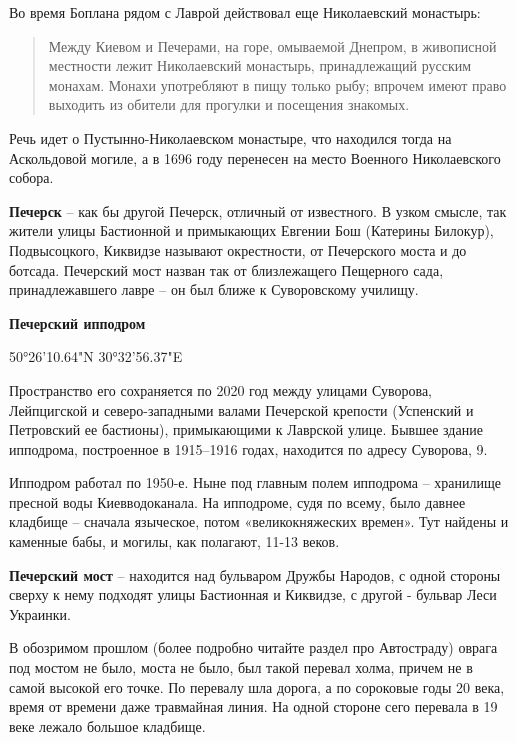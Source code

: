 Во время Боплана рядом с Лаврой действовал еще Николаевский монастырь:

\begin{quotation}
Между Киевом и Печерами, на горе, омываемой Днепром, в живописной местности лежит Николаевский монастырь, принадлежащий русским монахам. Монахи употребляют в пищу только рыбу; впрочем имеют право выходить из обители для прогулки и посещения знакомых.
\end{quotation}

Речь идет о Пустынно-Николаевском монастыре, что находился тогда на Аскольдовой могиле, а в 1696 году перенесен на место Военного Николаевского собора.\\

\medskip

\textbf{Печерск} – как бы другой Печерск, отличный от известного. В узком смысле, так жители улицы Бастионной и примыкающих Евгении Бош (Катерины Билокур), Подвысоцкого, Киквидзе называют окрестности, от Печерского моста и до ботсада. Печерский мост назван так от близлежащего Пещерного сада, принадлежавшего лавре – он был ближе к Суворовскому училищу.\\ 

\medskip

\textbf{Печерский ипподром}

50°26'10.64"N 30°32'56.37"E

Пространство его сохраняется по 2020 год между улицами Суворова, Лейпцигской и северо-западными валами Печерской крепости (Успенский и Петровский ее бастионы), примыкающими к Лаврской улице. Бывшее здание ипподрома, построенное в 1915–1916 годах, находится по адресу Суворова, 9.

Ипподром работал по 1950-е. Ныне под главным полем ипподрома – хранилище пресной воды Киевводоканала. На ипподроме, судя по всему, было давнее кладбище – сначала языческое, потом «великокняжеских времен». Тут найдены и каменные бабы, и могилы, как полагают, 11-13 веков.\\

\medskip

\textbf{Печерский мост} – находится над бульваром Дружбы Народов, с одной стороны сверху к нему подходят улицы Бастионная и Киквидзе, с другой - бульвар Леси Украинки.

В обозримом прошлом (более подробно читайте раздел про Автостраду) оврага под мостом не было, моста не было, был такой перевал холма, причем не в самой высокой его точке. По перевалу шла дорога, а по сороковые годы 20 века, время от времени даже травмайная линия. На одной стороне сего перевала в 19 веке лежало большое кладбище.

